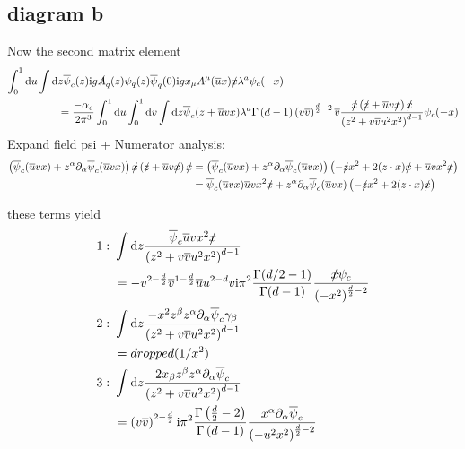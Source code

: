 \subsection{diagram b}
Now the second matrix element
\begin{align}
	\int _0^1 \text{d} u \int \text{d}& z \overline\psi_c(z) \text{i} g \slashed A_q(z)\psi_q(z) \overline\psi_q(0) \text{i} g x_\mu A^\mu(\overline u x ) \slashed x \lambda^a \psi_c(-x)
	\\
	&=\frac{-\alpha_s}{2\pi^3} \int_0^1 \text{d} u \int_0^1\text{d} v \int \text{d} z \overline\psi_c(z+\overline u vx ) \lambda^a \Gamma\left(d-1\right) \left( v \overline v\right)^{\frac{d}{2}-2} \overline v \frac{\slashed x \left( \slashed z + \overline u v \slashed x\right) \slashed x }{\left(z^2+v\overline v u^2 x^2\right)^{d-1}}\psi_c(-x)
\end{align}
Expand field psi + Numerator analysis:
\begin{align}
	\left(\overline\psi_c(\overline u vx) + z^\alpha\partial_\alpha\overline\psi_c(\overline u vx) \right) \slashed x \left( \slashed z + \overline u v \slashed x\right) \slashed x
	&=
	\left(\overline\psi_c(\overline u vx) + z^\alpha\partial_\alpha\overline\psi_c(\overline u vx) \right)\left(-\slashed z x^2 +2(z\cdot x)\slashed x  + \overline u v x^2 \slashed x\right)
	\\
	&=
	\overline\psi_c(\overline u vx) \overline u v x^2 \slashed x +z^\alpha\partial_\alpha\overline\psi_c(\overline u vx)\left(-\slashed z x^2 +2(z\cdot x)\slashed x \right)
\end{align}

these terms yield
\begin{align}
1:~&\int \text{d} z \frac{\overline\psi_c\overline u vx^2\slashed x}{\left(z^2+v\overline v u^2x^2\right)^{d-1}}
\\
&=-v^{2-\frac{d}{2}}\overline v ^{1-\frac{d}{2}}\overline u u^{2-d}v\text{i} \pi^2 \frac{\Gamma(d/2-1)}{\Gamma(d-1)}\frac{\slashed x \psi_c}{\left(-x^2\right)^{\frac{d}{2}-2}}
\\
2:~&\int \text{d} z \frac{-x^2 z^\beta z^\alpha \partial_\alpha\overline\psi_c \gamma_\beta}{\left(z^2+v\overline v u^2x^2\right)^{d-1}}
\\
&=dropped ( 1/x^2)
\\
3:~&\int \text{d} z \frac{2x_\beta z^\beta z^\alpha \partial_\alpha\overline\psi_c}{\left(z^2+v\overline v u^2x^2\right)^{d-1}}
\\
&=
\left( v \overline v \right) ^{2-\frac{d}{2}} \text{i} \pi^2 \frac{\Gamma\left(\frac{d}{2}-2\right)}{\Gamma\left(d-1\right)} \frac{x^\alpha\partial_\alpha\overline\psi_c}{\left(-u^2x^2\right)^{\frac{d}{2}-2}}
\end{align}

